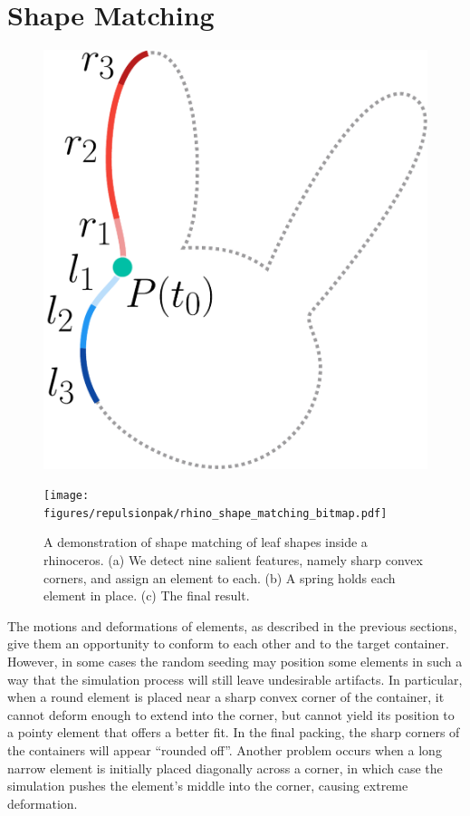 \section{Shape Matching}
\label{repulsionpak_shape_matching}



\begin{figure}[t]
\centering
\includegraphics[width=0.3\columnwidth]{figures/repulsionpak/descriptor_2.pdf}
\caption[A local shape descriptor for shape matching]
{\label{fig_shape_matching}
}
\end{figure}
\begin{figure}
\centering
\texttt{[image: figures/repulsionpak/rhino\_shape\_matching\_bitmap.pdf]} 
\caption[A demonstration of shape matching of leaf shapes inside a rhinoceros]
{\label{rhino_packing}
{ 
A demonstration of shape matching of leaf shapes inside a rhinoceros. 
(a) We detect nine salient features, namely sharp convex corners, and 
assign an element to each.
(b) A spring holds each element in place.
(c) The final result.
}
}
\end{figure}

The motions and deformations of elements, as described
in the previous sections, give them an opportunity to conform to each 
other and to the target container.  However, in some cases the random 
seeding may position some elements in such a way that the simulation 
process will still leave undesirable artifacts.  In particular, when
a round element is placed near a sharp convex corner of the container,
it cannot deform enough to extend into the corner, but cannot yield its
position to a pointy element that offers a better fit.  In the final
packing, the sharp corners of the containers will appear ``rounded off''.
Another problem occurs when a long narrow element is initially placed diagonally across a corner, 
in which case the simulation pushes the element's middle into the corner, causing extreme deformation.


